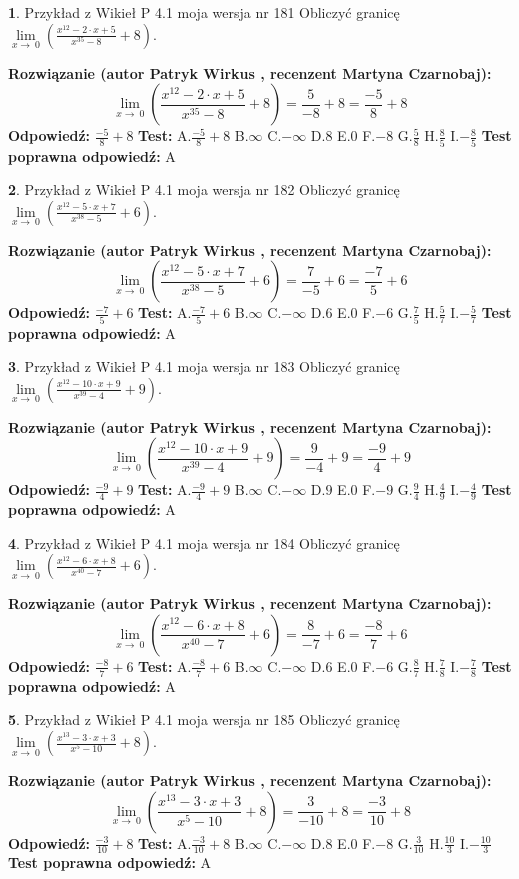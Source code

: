 \documentclass[12pt, a4paper]{article}
\theoremstyle{definition} %
\newtheorem{zad}{}
\newcommand{\zadStart}[1]{\begin{zad}#1\newline}
\newcommand{\zadStop}{\end{zad}}
\newcommand{\rozwStart}[2]{\noindent \textbf{Rozwiązanie (autor #1 , recenzent #2): }\newline}
\newcommand{\rozwStop}{\newline}
\newcommand{\odpStart}{\noindent \textbf{Odpowiedź:}\newline}
\newcommand{\odpStop}{\newline}
\newcommand{\testStart}{\noindent \textbf{Test:}\newline}
\newcommand{\testStop}{\newline}
\newcommand{\kluczStart}{\noindent \textbf{Test poprawna odpowiedź:}\newline}
\newcommand{\kluczStop}{\newline}
\begin{document}
\zadStart{Przykład z Wikieł P 4.1 moja wersja nr 181}
Obliczyć granicę $\lim\limits_{x\to\ 0}(\frac{x^{12}-2 \cdot x +5}{x^{35}-8}+8)$.
\zadStop
\rozwStart{Patryk Wirkus}{Martyna Czarnobaj}
$$\lim\limits_{x\to\ 0}(\frac{x^{12}-2 \cdot x +5}{x^{35}-8}+8)=\frac{5}{-8}+8=\frac{-5}{8}+8$$
\rozwStop
\odpStart
$\frac{-5}{8}+8$
\odpStop
\testStart
A.$\frac{-5}{8}+8$
B.$\infty$
C.$-\infty$
D.$8$
E.$0$
F.$-8$
G.$\frac{5}{8}$
H.$\frac{8}{5}$
I.$-\frac{8}{5}$
\testStop
\kluczStart
A
\kluczStop



\zadStart{Przykład z Wikieł P 4.1 moja wersja nr 182}
Obliczyć granicę $\lim\limits_{x\to\ 0}(\frac{x^{12}-5 \cdot x +7}{x^{38}-5}+6)$.
\zadStop
\rozwStart{Patryk Wirkus}{Martyna Czarnobaj}
$$\lim\limits_{x\to\ 0}(\frac{x^{12}-5 \cdot x +7}{x^{38}-5}+6)=\frac{7}{-5}+6=\frac{-7}{5}+6$$
\rozwStop
\odpStart
$\frac{-7}{5}+6$
\odpStop
\testStart
A.$\frac{-7}{5}+6$
B.$\infty$
C.$-\infty$
D.$6$
E.$0$
F.$-6$
G.$\frac{7}{5}$
H.$\frac{5}{7}$
I.$-\frac{5}{7}$
\testStop
\kluczStart
A
\kluczStop



\zadStart{Przykład z Wikieł P 4.1 moja wersja nr 183}
Obliczyć granicę $\lim\limits_{x\to\ 0}(\frac{x^{12}-10 \cdot x +9}{x^{39}-4}+9)$.
\zadStop
\rozwStart{Patryk Wirkus}{Martyna Czarnobaj}
$$\lim\limits_{x\to\ 0}(\frac{x^{12}-10 \cdot x +9}{x^{39}-4}+9)=\frac{9}{-4}+9=\frac{-9}{4}+9$$
\rozwStop
\odpStart
$\frac{-9}{4}+9$
\odpStop
\testStart
A.$\frac{-9}{4}+9$
B.$\infty$
C.$-\infty$
D.$9$
E.$0$
F.$-9$
G.$\frac{9}{4}$
H.$\frac{4}{9}$
I.$-\frac{4}{9}$
\testStop
\kluczStart
A
\kluczStop



\zadStart{Przykład z Wikieł P 4.1 moja wersja nr 184}
Obliczyć granicę $\lim\limits_{x\to\ 0}(\frac{x^{12}-6 \cdot x +8}{x^{40}-7}+6)$.
\zadStop
\rozwStart{Patryk Wirkus}{Martyna Czarnobaj}
$$\lim\limits_{x\to\ 0}(\frac{x^{12}-6 \cdot x +8}{x^{40}-7}+6)=\frac{8}{-7}+6=\frac{-8}{7}+6$$
\rozwStop
\odpStart
$\frac{-8}{7}+6$
\odpStop
\testStart
A.$\frac{-8}{7}+6$
B.$\infty$
C.$-\infty$
D.$6$
E.$0$
F.$-6$
G.$\frac{8}{7}$
H.$\frac{7}{8}$
I.$-\frac{7}{8}$
\testStop
\kluczStart
A
\kluczStop



\zadStart{Przykład z Wikieł P 4.1 moja wersja nr 185}
Obliczyć granicę $\lim\limits_{x\to\ 0}(\frac{x^{13}-3 \cdot x +3}{x^{5}-10}+8)$.
\zadStop
\rozwStart{Patryk Wirkus}{Martyna Czarnobaj}
$$\lim\limits_{x\to\ 0}(\frac{x^{13}-3 \cdot x +3}{x^{5}-10}+8)=\frac{3}{-10}+8=\frac{-3}{10}+8$$
\rozwStop
\odpStart
$\frac{-3}{10}+8$
\odpStop
\testStart
A.$\frac{-3}{10}+8$
B.$\infty$
C.$-\infty$
D.$8$
E.$0$
F.$-8$
G.$\frac{3}{10}$
H.$\frac{10}{3}$
I.$-\frac{10}{3}$
\testStop
\kluczStart
A
\kluczStop
\end{document}
